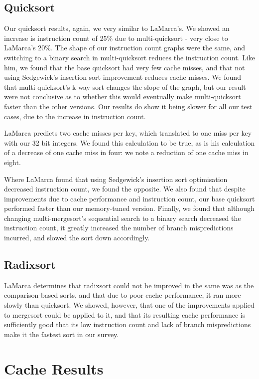 \subsection{Quicksort}

Our quicksort results, again, we very similar to LaMarca's. We showed an
increase is instruction count of 25\% due to multi-quicksort - very close to
LaMarca's 20\%. The shape of our instruction count graphs were the same, and
switching to a binary search in multi-quicksort reduces the instruction count.
Like him, we found that the base quicksort had very few cache misses, and that
not using Sedgewick's insertion sort improvement reduces cache misses. We found
that multi-quicksort's k-way sort changes the slope of the graph, but our result
were not conclusive as to whether this would eventually make multi-quicksort
faster than the other versions. Our results do show it being slower for all our
test cases, due to the increase in instruction count.

LaMarca predicts two cache misses per key, which translated to one miss per key
with our 32 bit integers. We found this calculation to be true, as is his
calculation of a decrease of one cache miss in four: we note a reduction of one
cache miss in eight.

Where LaMarca found that using Sedgewick's insertion sort optimisation decreased
instruction count, we found the opposite. We also found that despite
improvements due to cache performance and instruction count, our base quicksort
performed faster than our memory-tuned version. Finally, we found that although
changing multi-mergesort's sequential search to a binary search decreased the
instruction count, it greatly increased the number of branch mispredictions
incurred, and slowed the sort down accordingly.

\subsection{Radixsort}

LaMarca determines that radixsort could not be improved in the same was as the
comparison-based sorts, and that due to poor cache performance, it ran more
slowly than quicksort. We showed, however, that one of the improvements applied
to mergesort could be applied to it, and that its resulting cache performance is
sufficiently good that its low instruction count and lack of branch
mispredictions make it the fastest sort in our survey.


\section{Cache Results}

